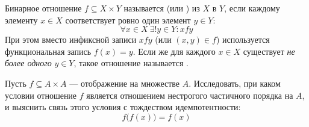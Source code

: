 \begin{definition}
    Бинарное отношение $f \subseteq X \times Y$ называется  (или ) из $X$ в $Y$, 
    если каждому элементу $x \in X$ соответствует ровно один элемент $y \in Y$:
    \begin{equation} \label{eq:map_uniq_def}
        \forall x \in X \ \exists! y \in Y : x f y \tag{2}
    \end{equation}
    При этом вместо инфиксной записи $x f y$ (или $(x, y) \in f$) 
    используется функциональная запись $f(x) = y$. Если же для каждого 
    $x \in X$ существует \emph{не более одного} $y \in Y$, такое отношение 
    называется .
\end{definition}

\begin{problem}
    Пусть $f \subseteq A \times A$ --- отображение на множестве $A$. 
    Исследовать, при каком условии отношение $f$ является отношением 
    нестрогого частичного порядка на $A$, и выяснить связь этого условия 
    с тождеством идемпотентности:
    \begin{equation} \label{eq:func_idemp}
        f\bigl(f(x)\bigr) = f(x) \tag{3}
    \end{equation}
\end{problem}

